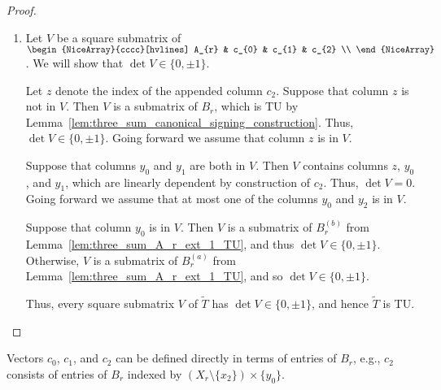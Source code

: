 \begin{proof}
\begin{enumerate}
        \item Let $V$ be a square submatrix of $\begin{NiceArray}{cccc}[hvlines] A_{r} & c_{0} & c_{1} & c_{2} \\ \end{NiceArray}$. We will show that $\det V \in \{0, \pm 1\}$.

        Let $z$ denote the index of the appended column $c_{2}$. Suppose that column $z$ is not in $V$. Then $V$ is a submatrix of $B_{r}$, which is TU by Lemma~\ref{lem:three_sum_canonical_signing_construction}. Thus, $\det V \in \{0, \pm 1\}$. Going forward we assume that column $z$ is in $V$.

        Suppose that columns $y_{0}$ and $y_{1}$ are both in $V$. Then $V$ contains columns $z$, $y_{0}$, and $y_{1}$, which are linearly dependent by construction of $c_{2}$. Thus, $\det V = 0$. Going forward we assume that at most one of the columns $y_{0}$ and $y_{2}$ is in $V$.

        Suppose that column $y_{0}$ is in $V$. Then $V$ is a submatrix of $B_{r}^{(b)}$ from Lemma~\ref{lem:three_sum_A_r_ext_1_TU}, and thus $\det V \in \{0, \pm 1\}$. Otherwise, $V$ is a submatrix of $B_{r}^{(a)}$ from Lemma~\ref{lem:three_sum_A_r_ext_1_TU}, and so $\det V \in \{0, \pm 1\}$.

        Thus, every square submatrix $V$ of $\tilde{T}$ has $\det V \in \{0, \pm 1\}$, and hence $\tilde{T}$ is TU.
    \end{enumerate}
\end{proof}

\begin{remark}
    Vectors $c_{0}$, $c_{1}$, and $c_{2}$ can be defined directly in terms of entries of $B_{r}$, e.g., $c_{2}$ consists of entries of $B_{r}$ indexed by $(X_{r} \setminus \{x_{2}\}) \times \{y_{0}\}$.
\end{remark}

